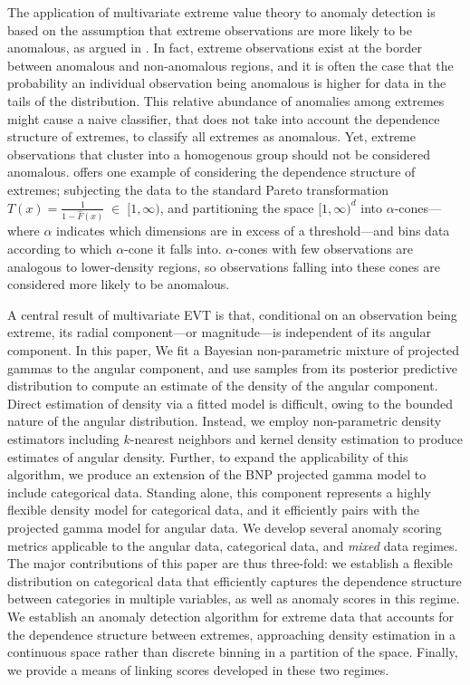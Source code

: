 The application of multivariate extreme value theory to anomaly detection is based on the 
    assumption that extreme observations are more likely to be anomalous, as argued
    in \cite{goix2017}. In fact, extreme observations exist at the border between 
    anomalous and non-anomalous regions, and it is often the case that the 
    probability an individual observation being anomalous is higher for data in the 
    tails of the distribution. This relative abundance of anomalies among extremes might 
    cause a naive classifier, that does not take into account the dependence structure 
    of extremes, to classify all extremes as anomalous. Yet, extreme observations 
    that cluster into a homogenous group should not be considered anomalous.
    \cite{goix2017} offers one example of considering the dependence structure of extremes;
    subjecting the data to the standard Pareto transformation 
        $T(x) = \frac{1}{1 - \hat{F}(x)}\;\in\;[1,\infty)$, 
    and partitioning the space $[1,\infty)^d$ into $\alpha$-cones---where $\alpha$ indicates
    which dimensions are in excess of a threshold---and bins data according to which 
    $\alpha$-cone it falls into.  $\alpha$-cones with few observations are 
    analogous to lower-density regions, so observations falling into these cones
    are considered more likely to be anomalous.

A central result of multivariate EVT is that, conditional on an observation being 
    extreme, its radial component---or magnitude---is independent of its angular component.
    In this paper, We fit a Bayesian non-parametric mixture of projected gammas to the angular 
    component, and use samples from its posterior predictive distribution to compute an estimate
    of the density of the angular component.   Direct estimation of density via a fitted model
    is difficult, owing to the bounded nature of the angular distribution.  Instead, we employ
    non-parametric density estimators including $k$-nearest neighbors and kernel density
    estimation to produce estimates of angular density.  Further, to expand the applicability
    of this algorithm, we produce an extension of the BNP projected gamma model to include 
    categorical data.   Standing alone, this component represents a highly flexible density 
    model for categorical data, and it efficiently pairs with the projected gamma model for 
    angular data.  We develop several anomaly scoring metrics applicable to the angular data,
    categorical data, and \emph{mixed} data regimes.  The major contributions of this paper are
    thus three-fold: we establish a flexible distribution on categorical data that efficiently
    captures the dependence structure between categories in multiple variables, as well as anomaly
    scores in this regime.  We establish an anomaly detection algorithm for extreme data that 
    accounts for the dependence structure between extremes, approaching density estimation in a 
    continuous space rather than discrete binning in a partition of the space.  Finally, we provide
    a means of linking scores developed in these two regimes.
    
